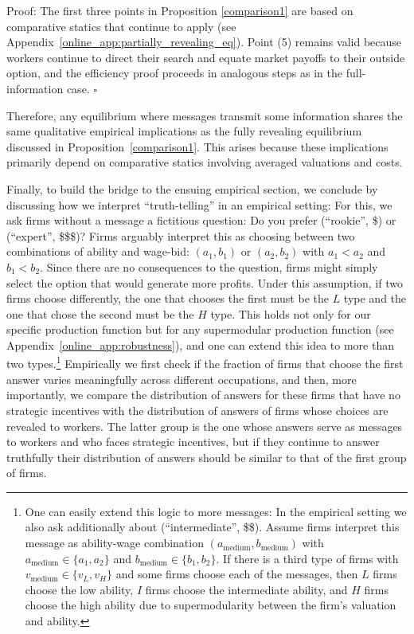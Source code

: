 \documentclass[12pt]{article}
\begin{document}
\noindent Proof: The first three points in Proposition \ref{comparison1} are based on comparative statics that continue to apply (see Appendix~\ref{online_app:partially_revealing_eq}). Point (5) remains valid because workers continue to direct their search and equate market payoffs to their outside option, and the efficiency proof proceeds in analogous steps as in the full-information case. $\square $ \bigskip

Therefore, any equilibrium where messages transmit some information shares the same qualitative empirical implications as the fully revealing equilibrium discussed in Proposition~\ref{comparison1}. This arises because these implications primarily depend on comparative statics involving averaged valuations and costs.

Finally, to build the bridge to the ensuing empirical section, we conclude by discussing how we interpret ``truth-telling'' in an empirical setting: For this, we ask firms without a message a fictitious question: Do you prefer (``rookie'', \$) or (``expert'', \$\$\$)? Firms arguably interpret this as choosing between two combinations of ability and wage-bid: $(a_{1},b_{1})$ or $(a_{2},b_{2})$ with $a_{1}<a_{2}$ and $b_{1}<b_{2}.$ Since there are no consequences to the question, firms might simply select the option that would generate more profits. Under this assumption, if two firms choose differently, the one that chooses the first must be the $L$ type and the one that chose the second must be the $H$ type. This holds not only for our specific production function but for any supermodular production function (see Appendix~\ref{online_app:robustness}), and one can extend this idea to more than two types.\footnote{One can easily extend this logic to more messages: In the empirical setting we also ask additionally about (``intermediate'', \$\$). Assume firms interpret this message as ability-wage combination $(a_{\text{medium}},b_{\text{medium}})$ with $a_{\text{medium}} \in \{a_1,a_2 \}$ and $b_{\text{medium}} \in \{b_1,b_2 \}$. If there is a third type of firms with $v_{\text{medium}} \in \{v_L,v_H\}$ and some firms choose each of the messages, then $L$ firms choose the low ability, $I$ firms choose the intermediate ability, and $H$ firms choose the high ability due to supermodularity between the firm's valuation and ability.} Empirically we first check if the fraction of firms that choose the first answer varies meaningfully across different occupations, and then, more importantly, we compare the distribution of answers for these firms that have no strategic incentives with the distribution of answers of firms whose choices are revealed to workers. The latter group is the one whose answers serve as messages to workers and who faces strategic incentives, but if they continue to answer truthfully their distribution of answers should be similar to that of the first group of firms.
\end{document}
